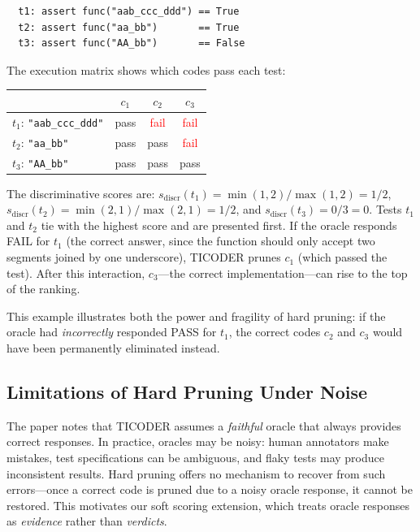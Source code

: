\documentclass[conference]{IEEEtran}
\begin{document}
\begin{small}
\begin{verbatim}
  t1: assert func("aab_ccc_ddd") == True
  t2: assert func("aa_bb")       == True
  t3: assert func("AA_bb")       == False
\end{verbatim}
\end{small}

The execution matrix shows which codes pass each test:

\begin{table}[h]
\centering
\begin{small}
\begin{tabular}{lccc}
\toprule
 & $c_1$ & $c_2$ & $c_3$ \\
\midrule
$t_1$: \texttt{"aab\_ccc\_ddd"} & \textcolor{green!60!black}{pass} & \textcolor{red}{fail} & \textcolor{red}{fail} \\
$t_2$: \texttt{"aa\_bb"} & \textcolor{green!60!black}{pass} & \textcolor{green!60!black}{pass} & \textcolor{red}{fail} \\
$t_3$: \texttt{"AA\_bb"} & \textcolor{green!60!black}{pass} & \textcolor{green!60!black}{pass} & \textcolor{green!60!black}{pass} \\
\bottomrule
\end{tabular}
\end{small}
\end{table}

The discriminative scores are: $s_{\text{discr}}(t_1) = \min(1,2)/\max(1,2) = 1/2$, $s_{\text{discr}}(t_2) = \min(2,1)/\max(2,1) = 1/2$, and $s_{\text{discr}}(t_3) = 0/3 = 0$. Tests $t_1$ and $t_2$ tie with the highest score and are presented first. If the oracle responds FAIL for $t_1$ (the correct answer, since the function should only accept two segments joined by one underscore), TICODER prunes $c_1$ (which passed the test). After this interaction, $c_3$---the correct implementation---can rise to the top of the ranking.

This example illustrates both the power and fragility of hard pruning: if the oracle had \emph{incorrectly} responded PASS for $t_1$, the correct codes $c_2$ and $c_3$ would have been permanently eliminated instead.

\subsection{Limitations of Hard Pruning Under Noise}

The paper notes that TICODER assumes a \emph{faithful} oracle that always provides correct responses. In practice, oracles may be noisy: human annotators make mistakes, test specifications can be ambiguous, and flaky tests may produce inconsistent results. Hard pruning offers no mechanism to recover from such errors---once a correct code is pruned due to a noisy oracle response, it cannot be restored. This motivates our soft scoring extension, which treats oracle responses as \emph{evidence} rather than \emph{verdicts}.
\end{document}
